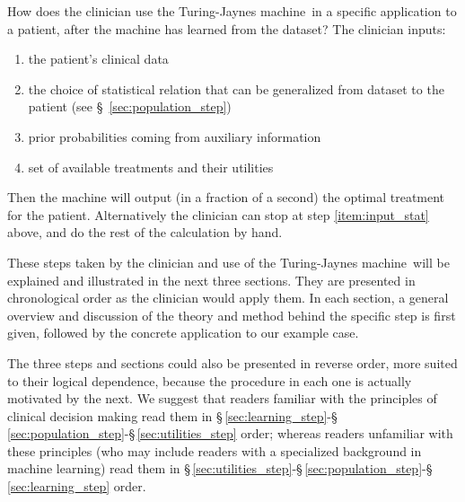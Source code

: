 \documentclass[utf8]{FrontiersinHarvard} %
\newcommand*{\sect}{\S}%
\renewcommand*{\|}[1][]{\nonscript\:#1\vert\nonscript\:\mathopen{}}
\newcommand*{\tjm}{Turing-Jaynes machine}
\begin{document}
How does the clinician use the \tjm\ in a specific application to a patient, after the machine has learned from the dataset? The clinician inputs:
  \begin{enumerate}
  \item\label{item:input_data} the patient's clinical data
  \item\label{item:input_stat} the choice of statistical relation that can be generalized from dataset to the patient (see \sect~\ref{sec:population_step})
  \item prior probabilities coming from auxiliary information
  \item set of available treatments and their utilities
  \end{enumerate}
  Then the machine will output (in a fraction of a second) the optimal treatment for the patient. Alternatively the clinician can stop at step \ref{item:input_stat} above, and do the rest of the calculation by hand.


These steps taken by the clinician and use of the \tjm\ will be explained and illustrated in the next three sections. They are presented in chronological order as the clinician would apply them. In each section, a general overview and discussion of the theory and method behind the specific step is first given, followed by the concrete application to our example case.

The three steps and sections could also be presented in reverse order, more suited to their logical dependence, because the procedure in each one is actually motivated by the next. We suggest that readers familiar with the principles of clinical decision making read them in \sect\,\ref{sec:learning_step}-\sect\,\ref{sec:population_step}-\sect\,\ref{sec:utilities_step} order; whereas readers unfamiliar with these principles (who may include readers with a specialized background in machine learning) read them in \sect\,\ref{sec:utilities_step}-\sect\,\ref{sec:population_step}-\sect\,\ref{sec:learning_step} order.

\end{document}
